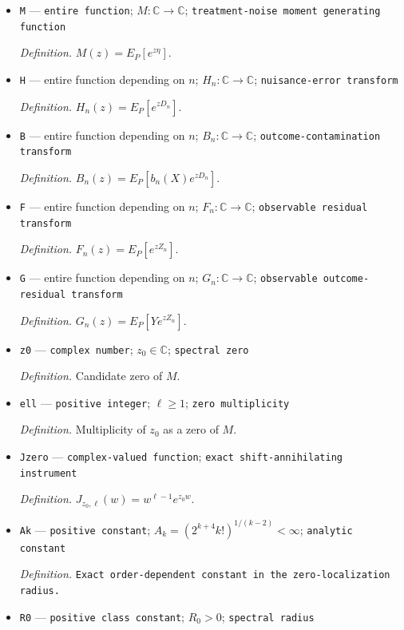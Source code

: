 \documentclass{article}
\begin{document}
\begin{itemize}
  \item \texttt{M} --- \texttt{entire function}; \(M:\mathbb C\to\mathbb C\); \texttt{treatment-\allowbreak{}noise moment generating function}
  \par\smallskip\noindent\emph{Definition.} \(M(z)=E_P[e^{z\eta}]\).
  \item \texttt{H} --- entire function depending on \(n\); \(H_n:\mathbb C\to\mathbb C\); \texttt{nuisance-\allowbreak{}error transform}
  \par\smallskip\noindent\emph{Definition.} \(H_n(z)=E_P[e^{zD_n}]\).
  \item \texttt{B} --- entire function depending on \(n\); \(B_n:\mathbb C\to\mathbb C\); \texttt{outcome-\allowbreak{}contamination transform}
  \par\smallskip\noindent\emph{Definition.} \(B_n(z)=E_P[b_n(X)e^{zD_n}]\).
  \item \texttt{F} --- entire function depending on \(n\); \(F_n:\mathbb C\to\mathbb C\); \texttt{observable residual transform}
  \par\smallskip\noindent\emph{Definition.} \(F_n(z)=E_P[e^{zZ_n}]\).
  \item \texttt{G} --- entire function depending on \(n\); \(G_n:\mathbb C\to\mathbb C\); \texttt{observable outcome-\allowbreak{}residual transform}
  \par\smallskip\noindent\emph{Definition.} \(G_n(z)=E_P[Ye^{zZ_n}]\).
  \item \texttt{z0} --- \texttt{complex number}; \(z_0\in\mathbb C\); \texttt{spectral zero}
  \par\smallskip\noindent\emph{Definition.} Candidate zero of \(M\).
  \item \texttt{ell} --- \texttt{positive integer}; \(\ell\ge1\); \texttt{zero multiplicity}
  \par\smallskip\noindent\emph{Definition.} Multiplicity of \(z_0\) as a zero of \(M\).
  \item \texttt{Jzero} --- \texttt{complex-\allowbreak{}valued function}; \texttt{exact shift-\allowbreak{}annihilating instrument}
  \par\smallskip\noindent\emph{Definition.} \(J_{z_0,\ell}(w)=w^{\ell-1}e^{z_0w}\).
  \item \texttt{Ak} --- \texttt{positive constant}; \(A_k=(2^{k+4}k!)^{1/(k-2)}<\infty\); \texttt{analytic constant}
  \par\smallskip\noindent\emph{Definition.} \texttt{Exact order-\allowbreak{}dependent constant in the zero-\allowbreak{}localization radius.}
  \item \texttt{R0} --- \texttt{positive class constant}; \(R_0>0\); \texttt{spectral radius}

\end{itemize}
\end{document}
